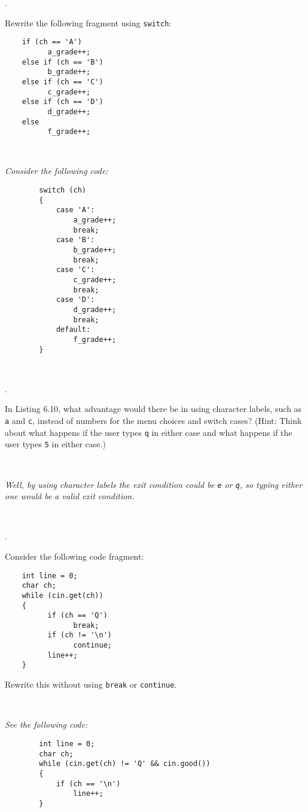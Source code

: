\documentclass{amsart}
\begin{document}
. 
\begin{minipage}[t]{11.5 cm}
	Rewrite the following fragment using \texttt{switch}:
	\begin{verbatim}
	if (ch == 'A')
	      a_grade++;
	else if (ch == 'B')
	      b_grade++;
	else if (ch == 'C')
	      c_grade++;
	else if (ch == 'D')
	      d_grade++;
	else
	      f_grade++;
	\end{verbatim}
\end{minipage} \\[1ex]
\phantom{2. } 
\begin{minipage}[t]{11.5 cm}
	{\slshape Consider the following code:}
	\begin{verbatim}
		switch (ch)
		{
		    case 'A':
		        a_grade++;
		        break;
		    case 'B':
		        b_grade++;
		        break;
		    case 'C':
		        c_grade++;
		        break;
		    case 'D':
		        d_grade++;
		        break;
		    default:
		        f_grade++;
		}
	\end{verbatim} 
\end{minipage} 
\\[.2cm]
\vfill

. 
\begin{minipage}[t]{11.5 cm}
	In Listing 6.10, what advantage would there be in using character labels, such as \texttt{a} and \texttt{c}, instead of numbers for the menu choices and switch cases? (Hint: Think about what happens if the user types \verb+q+ in either case and what happens if the user types \texttt{5} in either case.)
\end{minipage} \\[1ex]
\phantom{3. } 
\begin{minipage}[t]{11.5 cm}
	{\slshape Well, by using character labels the exit condition could be \verb+e+ or \verb+q+, so typing either one would be a valid exit condition.} 
\end{minipage} 
\\[.2cm]
\vfill

. 
\begin{minipage}[t]{11.5 cm}
	Consider the following code fragment:
	\begin{verbatim}
	int line = 0;
	char ch;
	while (cin.get(ch))
	{
	      if (ch == 'Q')
	            break;
	      if (ch != '\n')
	            continue;
	      line++;
	}
	\end{verbatim}
Rewrite this without using \texttt{break} or \texttt{continue}.
\end{minipage} \\[1ex]
\phantom{2. } 
\begin{minipage}[t]{11.5 cm}
	{\slshape See the following code:} 
	\begin{verbatim}
		int line = 0;
		char ch;
		while (cin.get(ch) != 'Q' && cin.good())
		{
		    if (ch == '\n')
		        line++;
		}
	\end{verbatim}
\end{minipage} 
\vfill
\end{document}
